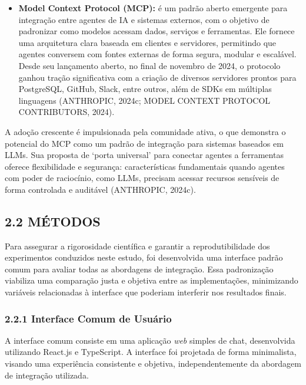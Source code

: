 \documentclass[
]{article}
\providecommand{\tightlist}{%
  \setlength{\itemsep}{0pt}\setlength{\parskip}{0pt}}
\begin{document}
\begin{itemize}
\tightlist
\item
  \textbf{Model Context Protocol (MCP):} é um padrão aberto emergente
  para integração entre agentes de IA e sistemas externos, com o
  objetivo de padronizar como modelos acessam dados, serviços e
  ferramentas. Ele fornece uma arquitetura clara baseada em clientes e
  servidores, permitindo que agentes conversem com fontes externas de
  forma segura, modular e escalável. Desde seu lançamento aberto, no
  final de novembro de 2024, o protocolo ganhou tração significativa com
  a criação de diversos servidores prontos para PostgreSQL, GitHub,
  Slack, entre outros, além de SDKs em múltiplas linguagens (ANTHROPIC,
  2024c; MODEL CONTEXT PROTOCOL CONTRIBUTORS, 2024).
\end{itemize}

A adoção crescente é impulsionada pela comunidade ativa, o que demonstra
o potencial do MCP como um padrão de integração para sistemas baseados
em LLMs. Sua proposta de `porta universal' para conectar agentes a
ferramentas oferece flexibilidade e segurança: características
fundamentais quando agentes com poder de raciocínio, como LLMs, precisam
acessar recursos sensíveis de forma controlada e auditável (ANTHROPIC,
2024c).

\subsection{2.2 MÉTODOS}\label{muxe9todos}

Para assegurar a rigorosidade científica e garantir a reprodutibilidade
dos experimentos conduzidos neste estudo, foi desenvolvida uma interface
padrão comum para avaliar todas as abordagens de integração. Essa
padronização viabiliza uma comparação justa e objetiva entre as
implementações, minimizando variáveis relacionadas à interface que
poderiam interferir nos resultados finais.

\subsubsection{2.2.1 Interface Comum de
Usuário}\label{interface-comum-de-usuuxe1rio}

A interface comum consiste em uma aplicação \emph{web} simples de chat,
desenvolvida utilizando React.js e TypeScript. A interface foi projetada
de forma minimalista, visando uma experiência consistente e objetiva,
independentemente da abordagem de integração utilizada.
\end{document}
